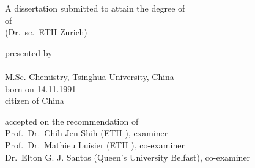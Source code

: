 \begin{titlepage}
  \makeatletter
	\begin{addmargin}[0.5cm]{-0.5cm}
    \begin{center}
        \large
        \begingroup
            {\large {}}
        \endgroup

        \hfill

        \vfill

        \begingroup
        {\LARGE \myTitle}
        \endgroup

        \vfill

        \begingroup
            A dissertation submitted to attain the degree of\\
            \vspace{0.5em}
            of
             \\
            (Dr.\ sc.\ ETH Zurich)
        \endgroup

        \vfill

        \begingroup
            presented by\\
            \vspace{0.5em}
            {\huge \ct@caps \myName}\\
            \vspace{2 em}
            M.Sc. Chemistry, Tsinghua University, China \\
            born on 14.11.1991\\
            citizen of China
        \endgroup

        \vfill

        \begingroup
            accepted on the recommendation of\\
            \vspace{0.5em}
            Prof.\ Dr.\ Chih-Jen Shih (ETH \zurich{}), examiner\\
            Prof.\ Dr.\  Mathieu Luisier (ETH \zurich{}), co-examiner\\
            Dr.\ Elton G. J. Santos (Queen's University Belfast), co-examiner\\
        \endgroup

        \vfill

        \myTime%

        \vfill
    \end{center}
  \end{addmargin}
  \makeatother
\end{titlepage}
